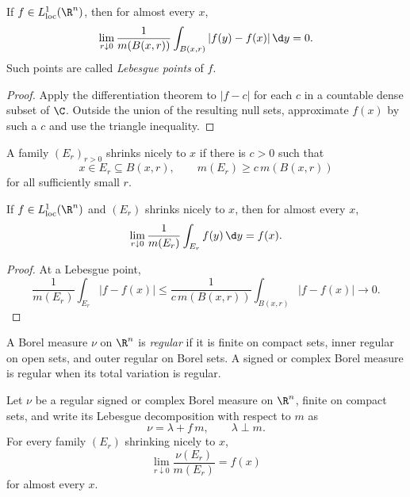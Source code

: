\begin{thm}
If $f\in L^1_{\loc}(\R^n)$, then for almost every $x$,
\[
\lim_{r\downarrow0}\frac1{m(B(x,r))}
\int_{B(x,r)}|f(y)-f(x)|\,\d y=0.
\]
Such points are called \emph{Lebesgue points} of $f$.
\end{thm}

\begin{proof}
Apply the differentiation theorem to $|f-c|$ for each $c$ in a countable dense subset of $\C$. Outside the union of the resulting null sets, approximate $f(x)$ by such a $c$ and use the triangle inequality.
\end{proof}

\begin{de}
A family $(E_r)_{r>0}$ shrinks nicely to $x$ if there is $c>0$ such that
\[
x\in E_r\subseteq B(x,r),
\qquad
m(E_r)\geq c\,m(B(x,r))
\]
for all sufficiently small $r$.
\end{de}

\begin{cor}
If $f\in L^1_{\loc}(\R^n)$ and $(E_r)$ shrinks nicely to $x$, then for almost every $x$,
\[
\lim_{r\downarrow0}\frac1{m(E_r)}\int_{E_r}f(y)\,\d y=f(x).
\]
\end{cor}

\begin{proof}
At a Lebesgue point,
\[
\frac1{m(E_r)}\int_{E_r}|f-f(x)|
\leq\frac1{c\,m(B(x,r))}\int_{B(x,r)}|f-f(x)|\to0.
\]
\end{proof}

\begin{de}
A Borel measure $\nu$ on $\R^n$ is \emph{regular} if it is finite on compact sets, inner regular on open sets, and outer regular on Borel sets. A signed or complex Borel measure is regular when its total variation is regular.
\end{de}

\begin{thm}
Let $\nu$ be a regular signed or complex Borel measure on $\R^n$, finite on compact sets, and write its Lebesgue decomposition with respect to $m$ as
\[
\nu=\lambda+f\,m,
\qquad \lambda\perp m.
\]
For every family $(E_r)$ shrinking nicely to $x$,
\[
\lim_{r\downarrow0}\frac{\nu(E_r)}{m(E_r)}=f(x)
\]
for almost every $x$.
\end{thm}

